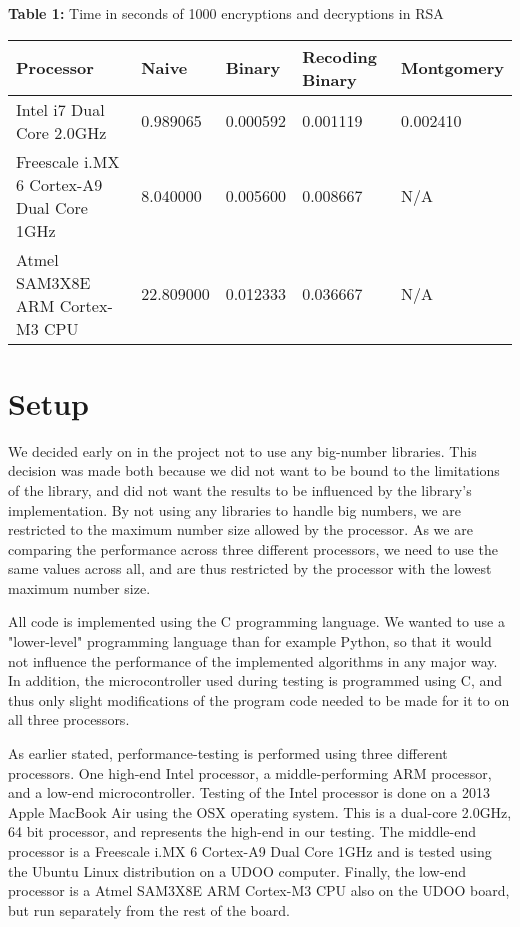 \documentclass[twocolumn]{IEEEtran}
\begin{document}
\begin{table*}[!htb] 
\textbf{Table 1:} Time in seconds of 1000 encryptions and decryptions in RSA \\[1em]
    \centering
    \begin{tabular}{|l|l|l|l|l|}
    \hline
    {\bf Processor}                                 & {\bf Naive}     & {\bf Binary}   & {\bf Recoding Binary} & {\bf Montgomery} \\ \hline
    Intel i7 Dual Core 2.0GHz                 & 0.989065  & 0.000592 & 0.001119        & 0.002410   \\ \hline
    Freescale i.MX 6 Cortex-A9 Dual Core 1GHz & 8.040000  & 0.005600 & 0.008667        & N/A       \\ \hline
    Atmel SAM3X8E ARM Cortex-M3 CPU           & 22.809000 & 0.012333 & 0.036667        & N/A       \\ \hline
    \end{tabular}
\end{table*}

\section{Setup}
We decided early on in the project not to use any big-number libraries. This decision was made both because we did not want to be bound to the limitations of the library, and did not want the results to be influenced by the library's implementation. By not using any libraries to handle big numbers, we are restricted to the maximum number size allowed by the processor. As we are comparing the performance across three different processors, we need to use the same values across all, and are thus restricted by the processor with the lowest maximum number size. 

All code is implemented using the C programming language.  We wanted to use a "lower-level" programming language than for example Python, so that it would not influence the performance of the implemented algorithms in any major way. In addition, the microcontroller used during testing is programmed using C, and thus only slight modifications of the program code needed to be made for it to on all three processors.

As earlier stated, performance-testing is performed using three different processors. One high-end Intel processor, a middle-performing ARM processor, and a low-end microcontroller. Testing of the Intel processor is done on a 2013 Apple MacBook Air using the OSX operating system. This is a dual-core 2.0GHz, 64 bit processor, and represents the high-end in our testing. The middle-end processor is a Freescale i.MX 6 Cortex-A9 Dual Core 1GHz and is tested using the Ubuntu Linux distribution on a UDOO computer. Finally, the low-end processor is a Atmel SAM3X8E ARM Cortex-M3 CPU also on the UDOO board, but run separately from the rest of the board.
\end{document}
